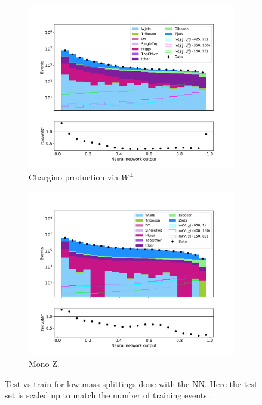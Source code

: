 \begin{figure}[H]
\begin{subfigure}[t!]{0.49\textwidth}
        \label{fig:SlepsnuNNLow}
    \end{subfigure}      
    \begin{subfigure}[t!]{0.49\textwidth}
        \includegraphics[width = \textwidth]{Figures/Stacked/stackedplot_NN_All_level_WW.pdf}
        \caption{Chargino production via $W^\pm$.}
        \label{fig:WWNNLow}
    \end{subfigure}
    \begin{subfigure}[t!]{0.49\textwidth}
        \includegraphics[width = \textwidth]{Figures/Stacked/stackedplot_NN_All_level_monoZ.pdf}
        \caption{Mono-Z.}
        \label{fig:MonoZNNLow}
    \end{subfigure}
    \caption{Test vs train for low mass splittings done with the NN. Here the test set is scaled up to match the number of training events.}
    \label{fig:AllLowNN}
\end{figure}


